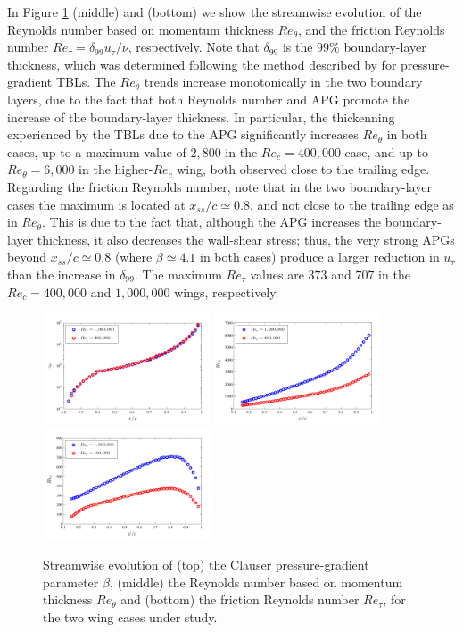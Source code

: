 \documentclass[preprint,12pt,authoryear]{elsarticle}
\begin{document}
In Figure \ref{beta_Reth_Ret} (middle) and (bottom) we show the streamwise evolution of the Reynolds number based on momentum thickness $Re_{\theta}$, and the friction Reynolds number $Re_{\tau}=\delta_{99} u_{\tau} / \nu$, respectively. Note that $\delta_{99}$ is the $99\%$ boundary-layer thickness, which was determined following the method described by \cite{vinuesa_diagnostic} for pressure-gradient TBLs. The $Re_{\theta}$ trends increase monotonically in the two boundary layers, due to the fact that both Reynolds number and APG promote the increase of the boundary-layer thickness. In particular, the thickenning experienced by the TBLs due to the APG significantly increases $Re_{\theta}$ in both cases, up to a maximum value of $2,800$ in the $Re_{c}=400,000$ case, and up to $Re_{\theta}=6,000$ in the higher-$Re_{c}$ wing, both observed close to the trailing edge. Regarding the friction Reynolds number, note that in the two boundary-layer cases the maximum is located at $x_{ss} / c\simeq 0.8$, and not close to the trailing edge as in $Re_{\theta}$. This is due to the fact that, although the APG increases the boundary-layer thickness, it also decreases the wall-shear stress; thus, the very strong APGs beyond $x_{ss} /c \simeq 0.8$ (where $\beta \simeq 4.1$ in both cases) produce a larger reduction in $u_{\tau}$ than the increase in $\delta_{99}$. The maximum $Re_{\tau}$ values are $373$ and $707$ in the $Re_{c}=400,000$ and $1,000,000$ wings, respectively.
\begin{figure}[t]
\centering
\includegraphics[width=0.44\textwidth]{beta_vs_x}
\includegraphics[width=0.44\textwidth]{Reth_vs_x}
\includegraphics[width=0.44\textwidth]{Ret_vs_x}
\caption{Streamwise evolution of (top) the Clauser pressure-gradient parameter $\beta$, (middle) the Reynolds number based on momentum thickness $Re_{\theta}$ and (bottom) the friction Reynolds number $Re_{\tau}$, for the two wing cases under study.}
\label{beta_Reth_Ret}
\end{figure}
\end{document}
